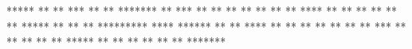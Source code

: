  *****     **    **       ***       **    **    *******
**         ***   **      ** **      **   **     **
**         ****  **     **   **     **  **      **
 *****     ** ** **    *********    ****        ******
     **    **  ****    **     **    **  **      **
     **    **   ***    **     **    **   **     **
 *****     **    **    **     **    **    **    *******